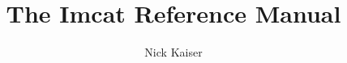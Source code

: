 \documentclass{article}
\begin{document}
\title{\Huge The Imcat Reference Manual}
\author{\huge Nick Kaiser}
\maketitle
\clearpage
\tableofcontents
\clearpage
\end{document}
